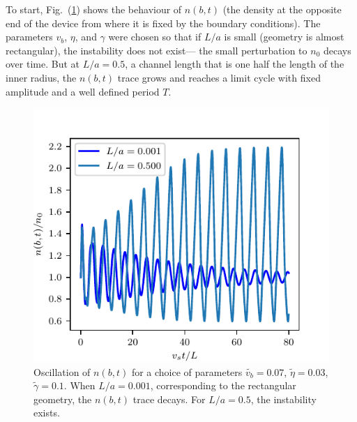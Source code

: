 \documentclass[12pt]{article}
\begin{document}
To start, Fig.~(\ref{fig:illustration}) shows the behaviour of $n(b, t)$ (the density at the opposite end of the device from where it is fixed by the boundary conditions). The parameters $v_b$, $\eta$, and $\gamma$ were chosen so that if $L / a$ is small (geometry is almost rectangular), the instability does not exist--- the small perturbation to $n_0$ decays over time.  But at $L/a=0.5$, a channel length that is one half the length of the inner radius, the $n(b,t)$ trace grows and reaches a limit cycle with fixed amplitude and a well defined period $T$. 
\begin{figure}[ht]
	\centering
    \includegraphics{Figures/illustration.pdf}
    \caption{Oscillation of $n(b, t)$ for a choice of parameters $\tilde{v_b}=0.07$, $\tilde{\eta}=0.03$, $\tilde{\gamma}=0.1$.  When $L/a = 0.001$, corresponding to the rectangular geometry, the $n(b,t)$ trace decays.  For $L/a=0.5$, the instability exists.}
    \label{fig:illustration}
\end{figure}


\end{document}
